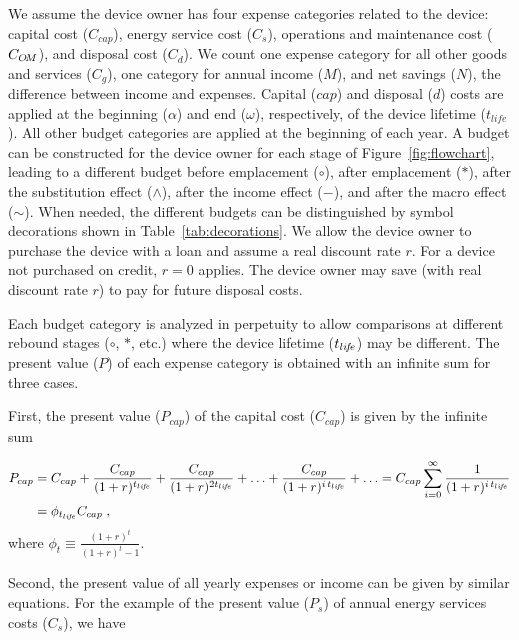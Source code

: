 
We assume the device owner has four expense categories 
related to the device:
capital cost ($C_{cap}$), 
energy service cost ($C_s$), 
operations and maintenance cost ($C_{O\!M}$), and
disposal cost ($C_d$).
We count one expense category for all other
goods and services ($C_g$),
one category for annual income ($M$), and 
net savings ($N$), 
the difference between income and expenses.
Capital ($cap$) and disposal ($d$) costs are applied
at the beginning ($\alpha$) and end ($\omega$), respectively, 
of the device lifetime ($t_{life}$).
All other budget categories are 
applied at the beginning of each year.
A budget can be constructed for the device owner for each stage
of Figure~\ref{fig:flowchart}, 
leading to a different budget 
before emplacement ($\circ$), 
after emplacement ($*$), 
after the substitution effect ($\wedge$), 
after the income effect ($-$), and 
after the macro effect ($\sim$).
When needed, 
the different budgets can be distinguished by symbol decorations
shown in Table~\ref{tab:decorations}.
We allow the device owner to purchase the device 
with a loan and assume a real discount rate $r$.
For a device not purchased on credit,
$r = 0$ applies.
The device owner may save (with real discount rate $r$)
to pay for future disposal costs.

Each budget category is analyzed in perpetuity
to allow comparisons at different rebound stages 
($\circ$, $*$, etc.)
where the device lifetime ($t_{li\!f\!e}$) may be different.
The present value ($P$) of each expense category is obtained
with an infinite sum for three cases.

First, the present value ($P_{cap}$) of the capital cost ($C_{cap}$) 
is given by the infinite sum 

\begin{align}
\footnotesize{}
  P_{cap} &= C_{cap} + \frac{C_{cap}}{(1 + r)^{\tlife}} + \frac{C_{cap}}{(1 + r)^{2 \tlife}} +
             \ldots + \frac{C_{cap}}{(1 + r)^{\itlife}} + \ldots 
           = C_{cap} \sum_{i = 0}^{\infty} \frac{1}{(1 + r)^{\itlife}} \nonumber \\
          &= \phi_{\tlife} C_{cap} \; ,
\end{align}
%
where $\phi_t \equiv \frac{(1 + r)^t}{(1 + r)^t - 1}$.

Second, the present value of all yearly expenses or income
can be given by similar equations.
For the example of the present value ($P_s$)
of annual energy services costs ($C_s$),
we have

